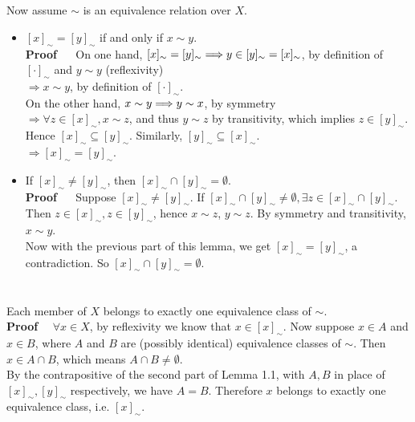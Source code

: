 \documentclass{article}
\begin{document}
    \section{}
        Now assume $\sim$ is an equivalence relation over $X$.
        \begin{itemize}
            \item $[x]_\sim = [y]_\sim$ if and only if $x \sim y$. \\
            
            \textbf{Proof} $\quad$ On one hand, $[x]_\sim = [y]_\sim \\
            \Longrightarrow y \in [y]_\sim = [x]_\sim$,
            by definition of $[\cdot]_\sim$ and $y \sim y$ (reflexivity) \\
            $\Longrightarrow x \sim y$, by definition of $[\cdot]_\sim$. \\
            
            On the other hand, $x \sim y \\
            \Longrightarrow y \sim x$, by symmetry \\
            $\Longrightarrow \forall z \in [x]_\sim, x \sim z$,
            and thus $y \sim z$ by transitivity,
            which implies $z \in [y]_\sim$. Hence $[x]_\sim \subseteq [y]_\sim$.
            Similarly, $[y]_\sim \subseteq [x]_\sim$. \\
            $\Longrightarrow [x]_\sim = [y]_\sim$. \\
            
            \item If $[x]_\sim \neq [y]_\sim$, then $[x]_\sim \cap [y]_\sim = \emptyset$. \\
            
            \textbf{Proof} $\quad$ Suppose $[x]_\sim \neq [y]_\sim$.
            If $[x]_\sim \cap [y]_\sim \neq \emptyset, \exists z \in [x]_\sim \cap [y]_\sim$.
            Then $z \in [x]_\sim, z \in [y]_\sim$,
            hence $x \sim z$, $y \sim z$.
            By symmetry and transitivity, $x \sim y$. \\
            Now with the previous part of this lemma, we get $[x]_\sim = [y]_\sim$, a contradiction.
            So $[x]_\sim \cap [y]_\sim = \emptyset$.
        \end{itemize}
    
    \section{}
        Each member of $X$ belongs to exactly one equivalence class of $\sim$. \\
        
        \textbf{Proof} $\quad \forall x \in X$, by reflexivity we know that $x \in [x]_\sim$.
        Now suppose $x \in A$ and $x \in B$,
        where $A$ and $B$ are (possibly identical) equivalence classes of $\sim$.
        Then $x \in A \cap B$, which means $A \cap B \neq \emptyset$. \\
        By the contrapositive of the second part of Lemma 1.1,
        with $A, B$ in place of $[x]_\sim, [y]_\sim$ respectively, we have $A = B$.
        Therefore $x$ belongs to exactly one equivalence class, i.e. $[x]_\sim$.
\end{document}
